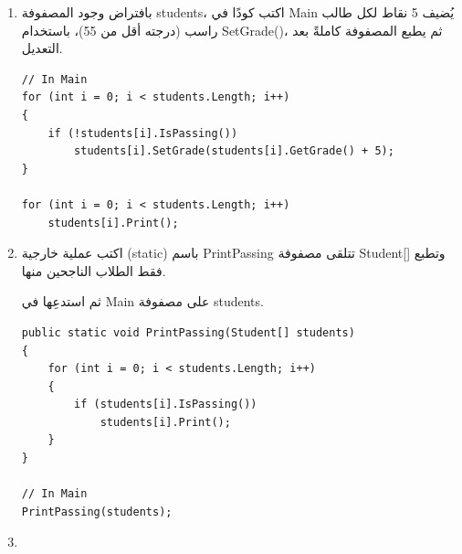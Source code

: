 \documentclass[14pt]{extarticle}
\begin{document}
\begin{enumerate}
\item %

بافتراض وجود المصفوفة \textenglish{students}، اكتب كودًا في \textenglish{Main} يُضيف 5 نقاط لكل طالب راسب (درجته أقل من 55)، باستخدام \textenglish{SetGrade()}، ثم يطبع المصفوفة كاملةً بعد التعديل.

\ifwithsols
{\small
\begin{boxSolution}
\begin{english}
\begin{verbatim}
// In Main
for (int i = 0; i < students.Length; i++)
{
    if (!students[i].IsPassing())
        students[i].SetGrade(students[i].GetGrade() + 5);
}

for (int i = 0; i < students.Length; i++)
    students[i].Print();
\end{verbatim}
\end{english}
\end{boxSolution}
}
\clearpage
\fi

\item %

اكتب عملية خارجية (\textenglish{static}) باسم \textenglish{PrintPassing} تتلقى مصفوفة \textenglish{Student[]} وتطبع فقط الطلاب الناجحين منها.

ثم استدعِها في \textenglish{Main} على مصفوفة \textenglish{students}.

\ifwithsols
{\small
\begin{boxSolution}
\begin{english}
\begin{verbatim}
public static void PrintPassing(Student[] students)
{
    for (int i = 0; i < students.Length; i++)
    {
        if (students[i].IsPassing())
            students[i].Print();
    }
}

// In Main
PrintPassing(students);
\end{verbatim}
\end{english}
\end{boxSolution}
}
\clearpage
\fi

\item %


\end{enumerate}
\end{document}
